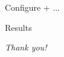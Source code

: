 \documentclass{beamer}
\begin{document}
\begin{frame}{Configure + ...}
    
\end{frame}

\begin{frame}{Results}
    
\end{frame}

\begin{frame}{}
  \centering \Large
  \emph{Thank you!}
\end{frame}

\end{document}

